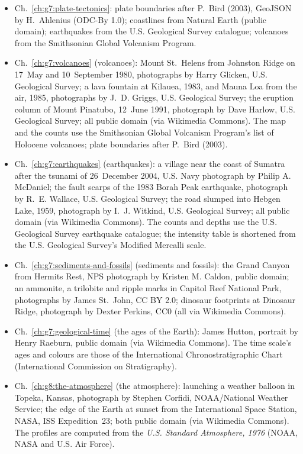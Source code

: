 \begin{itemize}
  \item Ch.~\ref{ch:g7:plate-tectonics}: plate boundaries after P.~Bird (2003), GeoJSON by H.~Ahlenius (ODC-By 1.0); coastlines from Natural Earth (public domain); earthquakes from the U.S. Geological Survey catalogue; volcanoes from the Smithsonian Global Volcanism Program.
  \item Ch.~\ref{ch:g7:volcanoes} (volcanoes): Mount St.~Helens from Johnston Ridge on 17~May and 10~September 1980, photographs by Harry Glicken, U.S. Geological Survey; a lava fountain at Kilauea, 1983, and Mauna Loa from the air, 1985, photographs by J.~D. Griggs, U.S. Geological Survey; the eruption column of Mount Pinatubo, 12~June 1991, photograph by Dave Harlow, U.S. Geological Survey; all public domain (via Wikimedia Commons). The map and the counts use the Smithsonian Global Volcanism Program's list of Holocene volcanoes; plate boundaries after P.~Bird (2003).
  \item Ch.~\ref{ch:g7:earthquakes} (earthquakes): a village near the coast of Sumatra after the tsunami of 26~December 2004, U.S. Navy photograph by Philip A. McDaniel; the fault scarps of the 1983 Borah Peak earthquake, photograph by R.~E. Wallace, U.S. Geological Survey; the road slumped into Hebgen Lake, 1959, photograph by I.~J. Witkind, U.S. Geological Survey; all public domain (via Wikimedia Commons). The counts and depths use the U.S. Geological Survey earthquake catalogue; the intensity table is shortened from the U.S. Geological Survey's Modified Mercalli scale.
  \item Ch.~\ref{ch:g7:sediments-and-fossils} (sediments and fossils): the Grand Canyon from Hermits Rest, NPS photograph by Kristen M. Caldon, public domain; an ammonite, a trilobite and ripple marks in Capitol Reef National Park, photographs by James St.~John, CC BY 2.0; dinosaur footprints at Dinosaur Ridge, photograph by Dexter Perkins, CC0 (all via Wikimedia Commons).
  \item Ch.~\ref{ch:g7:geological-time} (the ages of the Earth): James Hutton, portrait by Henry Raeburn, public domain (via Wikimedia Commons). The time scale's ages and colours are those of the International Chronostratigraphic Chart (International Commission on Stratigraphy).
  \item Ch.~\ref{ch:g8:the-atmosphere} (the atmosphere): launching a weather balloon in Topeka, Kansas, photograph by Stephen Corfidi, NOAA/National Weather Service; the edge of the Earth at sunset from the International Space Station, NASA, ISS Expedition~23; both public domain (via Wikimedia Commons). The profiles are computed from the \emph{U.S. Standard Atmosphere, 1976} (NOAA, NASA and U.S. Air Force).

\end{itemize}

